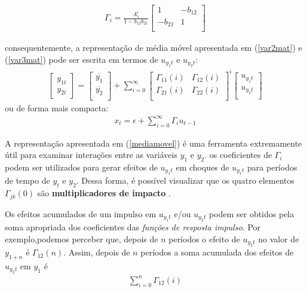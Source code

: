 \begin{align*}
\Gamma_i = \frac{A_1^i}{1 - b_{12}b_{21}}
\begin{bmatrix}
    1 & -b_{12} \\
    -b_{21} & 1 \\
\end{bmatrix}
\end{align*}

\noindent
consequentemente, a representação de média móvel apresentada em (\ref{var2mat}) e (\ref{var3mat}) pode ser escrita em termos de $u_{y_1t}$ e $u_{y_2t}$:
\begin{align} 
\begin{bmatrix}
    y_{1t} \\
    y_{2t}
\end{bmatrix}
=
\begin{bmatrix}
    \overline{y_1} \\
    \overline{y_2} \\
\end{bmatrix}
+ \sum_{i=0}^{\infty}
\begin{bmatrix}
    \Gamma_{11} (i) & \Gamma_{12} (i) \\
    \Gamma_{21} (i) & \Gamma_{22} (i)\\
\end{bmatrix}^i
\begin{bmatrix}
    u_{y_1t} \\
    u_{y_2t} \\
\end{bmatrix}
\end{align}
\noindent
ou de forma mais compacta:
\begin{align} \label{mediamovel}
    x_t = \epsilon + \sum_{i=0}^{\infty}\Gamma_i u_{t-1}
\end{align}

A representação apresentada em (\ref{mediamovel}) é uma ferramenta extremamente útil para examinar interações entre as variáveis $y_1$ e $y_2$. os coeficientes de $\Gamma_i$ podem ser utilizados para gerar efeitos de $u_{y_1t}$ em choques de $u_{y_1t}$ para períodos de tempo de $y_t$ e $y_2$. Dessa forma, é possível visualizar que os quatro elementos $\Gamma_{jk}(0)$ são \textbf{multiplicadores de impacto} \cite[p.295]{enders2008applied}.

Os efeitos acumulados de um impulso em  $u_{y_1t}$ e/ou $u_{y_2t}$ podem ser obtidos pela soma apropriada dos coeficientes das \textit{funções de resposta impulso}. Por exemplo,podemos perceber que, depois de $n$ períodos o efeito de $u_{y_2t}$ no valor de $y_{1 + n}$ é $\Gamma_{12}(n)$. Assim, depois de $n$ períodos a soma acumulada dos efeitos de $u_{y_2t}$ em $y_1$ é
\begin{align*}
    \sum_{i=0}^n \Gamma_{12}(i)
\end{align*}

